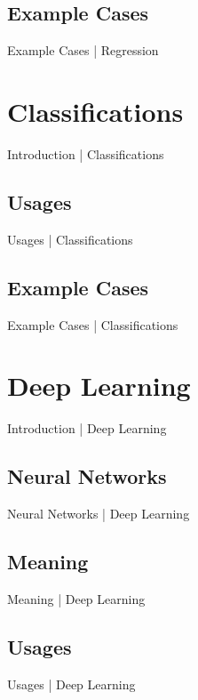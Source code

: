 \documentclass[10pt]{beamer}
\begin{document}
		\subsection{Example Cases}
			\begin{frame}{Example Cases | Regression}
			\end{frame}
	
	\section{Classifications}
		\begin{frame}{Introduction | Classifications}
		\end{frame}
		\subsection{Usages}
			\begin{frame}{Usages | Classifications}
			\end{frame}
		\subsection{Example Cases}
			\begin{frame}{Example Cases | Classifications}
			\end{frame}
	
	
	\section{Deep Learning}
		\begin{frame}{Introduction | Deep Learning}
		\end{frame}
		\subsection{Neural Networks}
			\begin{frame}{Neural Networks | Deep Learning}
			\end{frame}
		\subsection{Meaning}
			\begin{frame}{Meaning | Deep Learning}
			\end{frame}
		\subsection{Usages}
			\begin{frame}{Usages | Deep Learning}
			\end{frame}
\end{document}
